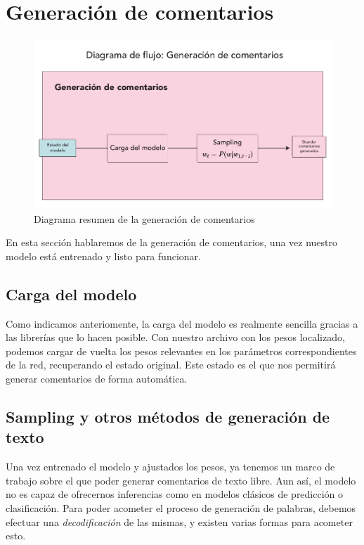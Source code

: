 \section{Generación de comentarios}

\begin{figure}[h]
	\centering
	\includegraphics[width=.9\textwidth]{media/comment-gen.pdf}
	\caption{Diagrama resumen de la generación de comentarios}
	\label{fig:comment-gen}
\end{figure}

En esta sección hablaremos de la generación de comentarios, una vez nuestro modelo está entrenado y listo para funcionar. 

\subsection{Carga del modelo}
Como indicamos anteriomente, la carga del modelo es realmente sencilla gracias a las librerías que lo hacen posible. Con nuestro archivo con los pesos localizado, podemos cargar de vuelta los pesos relevantes en los parámetros correspondientes de la red, recuperando el estado original. Este estado es el que nos permitirá generar comentarios de forma automática.

\subsection{Sampling y otros métodos de generación de texto}
Una vez entrenado el modelo y ajustados los pesos, ya tenemos un marco de trabajo sobre el que poder generar comentarios de texto libre. Aun así, el modelo no es capaz de ofrecernos inferencias como en modelos clásicos de predicción o clasificación. Para poder acometer el proceso de generación de palabras, debemos efectuar una \textit{decodificación} de las mismas, y existen varias formas para acometer esto. 

